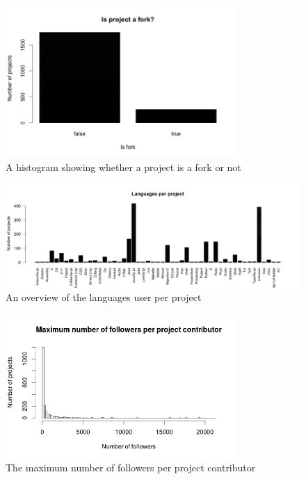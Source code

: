 	    \begin{figure}
	        \includegraphics[width=250pt]{figures/isfork-per-project}
	        \caption{A histogram showing whether a project is a fork or not}
	        \label{fig:is-fork-plot}
	    \end{figure}

	    \begin{figure}
	        \includegraphics[width=500pt]{figures/languages-per-project}
	        \caption{An overview of the languages user per project}
	        \label{fig:language-frequency-plot}
	    \end{figure}

	    \begin{figure}
	        \includegraphics[width=250pt]{figures/maximum-number-of-followers-per-project-contributor}
	        \caption{The maximum number of followers per project contributor}
	        \label{fig:max-follower-contributor-plot}
	    \end{figure}

